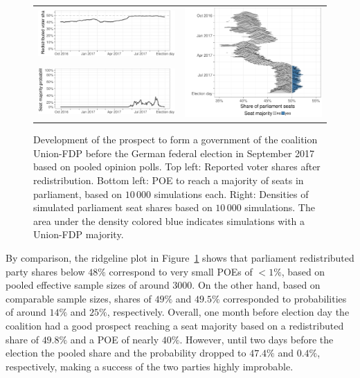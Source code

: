 \documentclass[smallcondensed]{svjour3}     %
\begin{document}
\begin{figure}[H]\centering
\begin{tabular}{ll}
\includegraphics[height=.15\textwidth]{figures/2017_pooled_cdufdp_rawSharesRedist.pdf}
&
\multirow{2}{*}[13ex]{\includegraphics[height=30ex]{figures/2017_pooled_cdufdp_ridgeline.pdf}}
\\
\includegraphics[height=.15\textwidth]{figures/2017_pooled_cdufdp_prob.pdf}
\end{tabular}
\caption{Development of the prospect to form a government of the coalition
Union-FDP before the German federal election in September 2017 based on pooled
opinion polls.
Top left: Reported voter shares after redistribution.
Bottom left: POE to reach a majority of seats in parliament, based on
$10\,000$ simulations each.
Right: Densities of simulated parliament seat shares based on $10\,000$ simulations.
The area under the density colored blue indicates simulations with a
Union-FDP majority.
\label{fig:2017_cdufdp}
}
\end{figure}

By comparison, the ridgeline plot in Figure~\ref{fig:2017_cdufdp}
shows that parliament redistributed party shares below $48\%$ correspond to very
small POEs of $<1\%$, based on pooled effective sample sizes of around $3000$.
On the other hand, based on comparable sample sizes, shares of $49\%$
and $49.5\%$ corresponded to probabilities of around $14\%$ and $25\%$,
respectively.
Overall, one month before election day the coalition had a good prospect
reaching a seat majority based on a redistributed share of $49.8\%$ and
a POE of nearly $40\%$. However, until two days before the election the pooled
share and the probability dropped to $47.4\%$ and $0.4\%$, respectively, making
a success of the two parties highly improbable.
\end{document}
